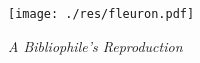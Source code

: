\begin{titlepage}
    \begin{center}
        \large

        \hfill

        \vfill

        \begingroup
            \color{Maroon} \\ \bigskip
        \endgroup

         \\
        
        \vfill
        
        \texttt{[image: ./res/fleuron.pdf]}
        
        \vfill


        \textit{A Bibliophile's Reproduction} \\ \medskip

        \myTime
        

        \vfill                      

    \end{center}  
\end{titlepage}   